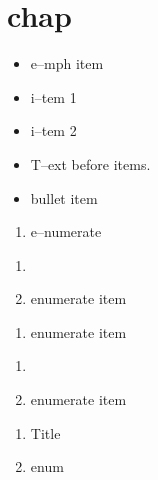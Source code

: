 \documentclass{book}
\begin{document}
\chapter{chap}
\label{anchor:chapter}%

\begin{itemize}[label=-]
\item {}%
e--mph item
\end{itemize}

\begin{itemize}[label=\textbullet{}]
\item {}%
i--tem 1
\item {}%
i--tem 2
\end{itemize}

\begin{itemize}
\item T--ext before items.
\item {}%
bullet item
\end{itemize}

\begin{enumerate}[start=1]

\item e--numerate
\end{enumerate}

\begin{enumerate}[start=1]
\item 
{}%

\item enumerate item
\end{enumerate}

\begin{enumerate}[start=1]

\item {}%
enumerate item
\end{enumerate}

\begin{enumerate}[start=1]
\item {}%

\item enumerate item
\end{enumerate}

\begin{enumerate}[start=1]
\item Title
\item {}%
enum
\end{enumerate}
\end{document}
